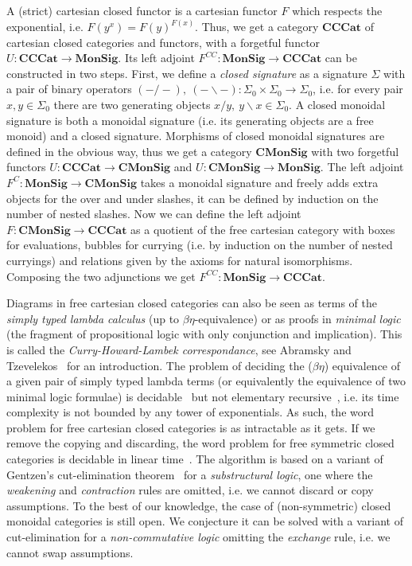 A (strict) cartesian closed functor is a cartesian functor $F$ which respects the exponential, i.e. $F(y^x) = F(y)^{F(x)}$.
Thus, we get a category $\mathbf{CCCat}$ of cartesian closed categories and functors, with a forgetful functor $U : \mathbf{CCCat} \to \mathbf{MonSig}$.
Its left adjoint $F^{CC} : \mathbf{MonSig} \to \mathbf{CCCat}$ can be constructed in two steps.
First, we define a \emph{closed signature} as a signature $\Sigma$ with a pair of binary operators $(- / -), \ (- \backslash -) : \Sigma_0 \times \Sigma_0 \to \Sigma_0$, i.e. for every pair $x, y \in \Sigma_0$ there are two generating objects $x / y, \ y \backslash x \in \Sigma_0$.
A closed monoidal signature is both a monoidal signature (i.e. its generating objects are a free monoid) and a closed signature.
Morphisms of closed monoidal signatures are defined in the obvious way, thus we get a category $\mathbf{CMonSig}$ with two forgetful functors $U : \mathbf{CCCat} \to \mathbf{CMonSig}$ and $U : \mathbf{CMonSig} \to \mathbf{MonSig}$.
The left adjoint $F^C : \mathbf{MonSig} \to \mathbf{CMonSig}$ takes a monoidal signature and freely adds extra objects for the over and under slashes, it can be defined by induction on the number of nested slashes.
Now we can define the left adjoint $F : \mathbf{CMonSig} \to \mathbf{CCCat}$ as a quotient of the free cartesian category with boxes for evaluations, bubbles for currying (i.e. by induction on the number of nested curryings) and relations given by the axioms for natural isomorphisms.
Composing the two adjunctions we get $F^{CC} : \mathbf{MonSig} \to \mathbf{CCCat}$.

Diagrams in free cartesian closed categories can also be seen as terms of the \emph{simply typed lambda calculus} (up to $\beta\eta$-equivalence) or as proofs in \emph{minimal logic} (the fragment of propositional logic with only conjunction and implication).
This is called the \emph{Curry-Howard-Lambek correspondance}, see Abramsky and Tzevelekos~\cite{AbramskyTzevelekos10} for an introduction.
The problem of deciding the ($\beta\eta$) equivalence of a given pair of simply typed lambda terms (or equivalently the equivalence of two minimal logic formulae) is decidable~\cite{Tait67} but not elementary recursive~\cite{Statman79}, i.e. its time complexity is not bounded by any tower of exponentials.
As such, the word problem for free cartesian closed categories is as intractable as it gets.
If we remove the copying and discarding, the word problem for free symmetric closed categories is decidable in linear time~\cite{Voreadou77}.
The algorithm is based on a variant of Gentzen's cut-elimination theorem~\cite{Gentzen35} for a \emph{substructural logic}, one where the \emph{weakening} and \emph{contraction} rules are omitted, i.e. we cannot discard or copy assumptions.
To the best of our knowledge, the case of (non-symmetric) closed monoidal categories is still open.
We conjecture it can be solved with a variant of cut-elimination for a \emph{non-commutative logic} omitting the \emph{exchange} rule, i.e. we cannot swap assumptions.

